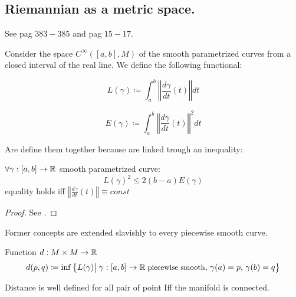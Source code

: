 \documentclass[a4paper,12pt]{scrartcl}    %
\begin{document}
\subsection{Riemannian as a metric space.}
 See \cite{Abate2011} pag $383-385$  and \cite{Jost2005} pag $15-17$.
 
 Consider the space $C^\infty([a,b],M)$ of the smooth parametrized curves from a closed interval of the real line.
 We define the following functional:
 \begin{definition}
 	\begin{displaymath}
 		L(\gamma) \coloneqq \int_a^b \left\Vert \frac{d \gamma}{dt} (t)\right\Vert dt
 	\end{displaymath}
\end{definition} 
 
\begin{definition}
  	\begin{displaymath}
 		E(\gamma) \coloneqq \int_a^b \left\Vert \frac{d \gamma}{dt} (t)\right\Vert^2 dt
 	\end{displaymath}
\end{definition} 
Are define them together because are linked trough an inequality:
\begin{proposition}
	$\forall \gamma : [a,b] \rightarrow \mathbb{R}$ smooth parametrized curve:
	\begin{equation}
		L(\gamma)^2 \leq 2(b-a)E(\gamma)
	\end{equation}
	equality holds iff $\left\Vert \frac{d \gamma}{dt} (t)\right\Vert \equiv const $
\end{proposition}	
\begin{proof}
	 See \cite[Lemma $1.4.2$ ]{Jost2005}.
\end{proof}
	
\begin{observation}
	Former concepts are extended slavishly to every piecewise smooth curve.
\end{observation}

\begin{definition}
	Function $d:M\times M \rightarrow \mathbb{R}$
	\begin{displaymath}
		d(p,q)\coloneqq \inf\big\{L(\gamma) \big\vert \; \gamma:[a,b]\rightarrow \mathbb{R} \; \textrm{\small piecewise smooth},\, \gamma(a)=p,\, \gamma(b)=q  \big\}
	\end{displaymath}
\end{definition}
\begin{observation}
	Distance is well defined for all pair of point Iff the manifold is connected. 
\end{observation}
\end{document}
